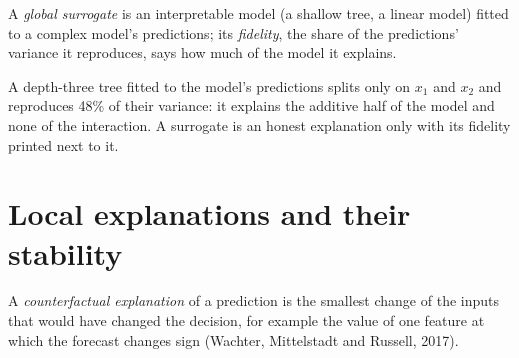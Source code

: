 \begin{omfigure}

\label{fig:ml:gov:ice}
\end{omfigure}

\begin{definition}\label{def:ml:interpretability-and-model-governance:surrogate}
A \emph{global surrogate} is an interpretable model (a shallow tree, a linear model) fitted to a
complex model's predictions; its \emph{fidelity}, the share of the predictions' variance it reproduces, says how much of the
model it explains.
\end{definition}

A depth-three tree fitted to the model's predictions splits only on $x_1$ and $x_2$ and reproduces 48\% of their variance: it
explains the additive half of the model and none of the interaction. A surrogate is an honest explanation only with its
fidelity printed next to it.

\section{Local explanations and their stability}

\begin{definition}\label{def:ml:interpretability-and-model-governance:cf}
A \emph{counterfactual explanation} of a prediction is the smallest change of the inputs that
would have changed the decision, for example the value of one feature at which the forecast changes sign (Wachter,
Mittelstadt and Russell, 2017).
\end{definition}

